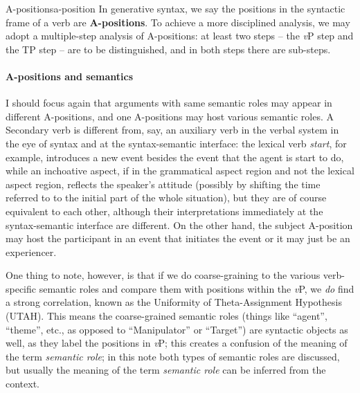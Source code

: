 \documentclass[a4paper, oneside]{report}
\newcommand*{\concept}[1]{\textbf{#1}}
\newcommand*{\term}[1]{\emph{#1}}
\newcommand{\form}[1]{\emph{#1}}
\newcommand{\vP}{\textit{v}P}
\begin{document}
\begin{theorybox}{A-positions}{a-position}
    In generative syntax, 
    we say the positions in the syntactic frame of a verb are \concept{A-positions}.
    To achieve a more disciplined analysis, 
    we may adopt a multiple-step analysis of A-positions:
    at least two steps -- the \vP{} step and the TP step 
    -- are to be distinguished,
    and in both steps there are sub-steps.

    \paragraph*{A-positions and semantics} 
    I should focus again that arguments with same semantic roles 
    may appear in different A-positions, 
    and one A-positions may host various semantic roles.
    A Secondary verb is different from, say, an auxiliary verb in the verbal system
    in the eye of syntax 
    and at the syntax-semantic interface:
    the lexical verb \form{start}, for example, 
    introduces a new event besides the event that the agent is start to do, 
    while an inchoative aspect, 
    if in the grammatical aspect region and not the lexical aspect region,
    reflects the speaker's attitude
    (possibly by shifting the time referred to 
    to the initial part of the whole situation),
    but they are of course equivalent to each other,
    although their interpretations 
    immediately at the syntax-semantic interface 
    are different.
    On the other hand, the subject A-position may host 
    the participant in an event that initiates the event 
    or it may just be an experiencer.

    One thing to note, however, is that if we do coarse-graining to the 
    various verb-specific semantic roles 
    and compare them with positions within the \vP, 
    we \emph{do} find a strong correlation, 
    known as the Uniformity of Theta-Assignment Hypothesis (UTAH).
    This means the coarse-grained semantic roles 
    (things like ``agent'', ``theme'', etc., 
    as opposed to ``Manipulator'' or ``Target'')
    are syntactic objects as well,
    as they label the positions in \vP;
    this creates a confusion of the meaning of the term \term{semantic role};
    in this note both types of semantic roles are discussed, 
    but usually the meaning of the term \term{semantic role} can be inferred from the context.


\end{theorybox}
\end{document}
